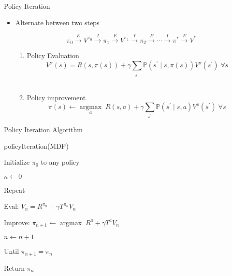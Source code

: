 \documentclass[11pt,table]{beamer}
\begin{document}
\begin{frame}{Policy Iteration}

    \begin{itemize}
        \item Alternate between two steps

$$
\pi_0 \xrightarrow{E} V^{\pi_0} \xrightarrow{I} \pi_1 \xrightarrow{E} V^{\pi_1} \xrightarrow{I} \pi_2 \xrightarrow{E} \cdots \xrightarrow{I} \pi^* \xrightarrow{E} V^{*}
$$

\begin{enumerate}
     
\item \textcolor{red1}{Policy Evaluation}\\
$$
V^{\pi}(s)=R(s, \pi(s))+\gamma \sum_{s^{\prime}} \mathbb{P}\left(s^{\prime} \mid s, \pi(s)\right) V^{\pi}\left(s^{\prime}\right) \; \forall s
$$\\[2ex]

\item \textcolor{red1}{Policy improvement}\\
$$
\pi(s) \leftarrow \underset{a}{\operatorname{argmax}} \; R(s, a)+\gamma \sum_{s^{\prime}} \mathbb{P}\left(s^{\prime} \mid s, a\right) V^{\pi}\left(s^{\prime}\right) \; \forall s
$$
\end{enumerate}
    \end{itemize}
    
\end{frame}


\begin{frame}{Policy Iteration Algorithm}

    \begin{tcolorbox}[colframe=black, boxrule=1pt, sharp corners]

\textcolor{red1}{policyIteration(MDP)}


Initialize $\pi_{0}$ to any policy

$n \leftarrow 0$

Repeat

\qquad Eval: $V_{n}=R^{\pi_{n}}+\gamma T^{\pi_{n}} V_{n}$

\qquad Improve: $\pi_{n+1} \leftarrow \operatorname{argmax} \; R^{a}+\gamma T^{a} V_{n}$

\qquad $n \leftarrow n+1$

Until $\pi_{n+1}=\pi_{n}$

Return $\pi_{n}$

    \end{tcolorbox}
\end{frame}
\end{document}
